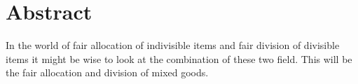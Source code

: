 \chapter*{Abstract}\label{chp:abstract}

In the world of fair allocation of indivisible items and fair division of divisible items it might be wise to look at the combination of these two field. This will be the fair allocation and division of mixed goods.